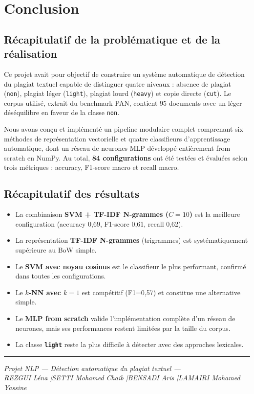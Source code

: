 \documentclass[12pt,a4paper]{article}
\begin{document}
\section{Conclusion}

\subsection{Récapitulatif de la problématique et de la réalisation}

Ce projet avait pour objectif de construire un système automatique de détection du plagiat textuel capable de distinguer quatre niveaux : absence de plagiat (\texttt{non}), plagiat léger (\texttt{light}), plagiat lourd (\texttt{heavy}) et copie directe (\texttt{cut}). Le corpus utilisé, extrait du benchmark PAN, contient 95 documents avec un léger déséquilibre en faveur de la classe \texttt{non}.

Nous avons conçu et implémenté un pipeline modulaire complet comprenant six méthodes de représentation vectorielle et quatre classifieurs d'apprentissage automatique, dont un réseau de neurones MLP développé entièrement from scratch en NumPy. Au total, \textbf{84 configurations} ont été testées et évaluées selon trois métriques : accuracy, F1-score macro et recall macro.

\subsection{Récapitulatif des résultats}

\begin{itemize}
    \item La combinaison \textbf{SVM + TF-IDF N-grammes ($C=10$)} est la meilleure configuration (accuracy 0,69, F1-score 0,61, recall 0,62).
    \item La représentation \textbf{TF-IDF N-grammes} (trigrammes) est systématiquement supérieure au BoW simple.
    \item Le \textbf{SVM avec noyau cosinus} est le classifieur le plus performant, confirmé dans toutes les configurations.
    \item Le \textbf{$k$-NN avec $k=1$} est compétitif (F1=0,57) et constitue une alternative simple.
    \item Le \textbf{MLP from scratch} valide l'implémentation complète d'un réseau de neurones, mais ses performances restent limitées par la taille du corpus.
    \item La classe \textbf{\texttt{light}} reste la plus difficile à détecter avec des approches lexicales.
\end{itemize}

\vspace{1cm}
\noindent\rule{\linewidth}{0.5pt}
\vspace{0.3cm}

\begin{center}
\textit{Projet NLP --- Détection automatique du plagiat textuel ---}\\[4pt]
\textit{REZGUI Léna \quad|\quad SETTI Mohamed Chaib \quad|\quad BENSADI Aris \quad|\quad LAMAIRI Mohamed Yassine}\\[4pt]
\end{center}
\end{document}
